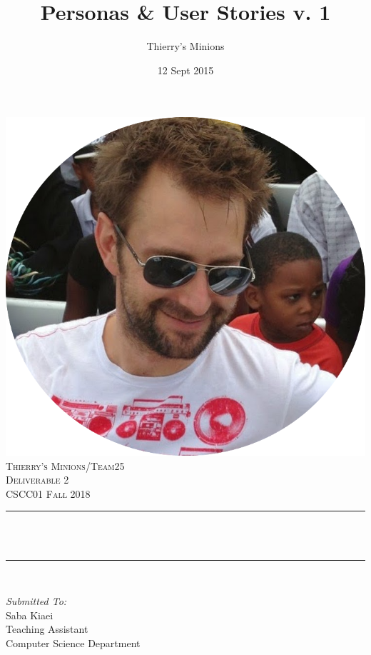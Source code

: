 \documentclass[12pt]{article}
\title{Personas \& User Stories v. 1}								%
\author{Thierry's Minions}								%
\date{12 Sept 2015}											%
\makeatletter
\let\thetitle\@title
\makeatother
\begin{document}

\begin{titlepage}
	\centering
    \vspace*{0.5 cm}
    \includegraphics[scale = 0.25]{leader.png}\\[1.0 cm]	%
    \textsc{\LARGE Thierry's Minions/Team25\\[0.5em] Deliverable 2}\\[2.0 cm]	
	\textsc{\Large CSCC01 Fall 2018}\\[0.5 cm]				%
	\rule{\linewidth}{0.2 mm} \\[0.4 cm]
	{ \huge \bfseries \thetitle}\\
	\rule{\linewidth}{0.2 mm} \\[1.5 cm]
	
	\begin{minipage}{0.4\textwidth}
		\begin{flushleft} \large
			\emph{Submitted To:}\\
			Saba Kiaei\\
            Teaching Assistant\\
            Computer Science Department\\
			\end{flushleft}
			\end{minipage}~
			\begin{minipage}{0.4\textwidth}
            

\end{minipage}
\end{titlepage}
\end{document}
